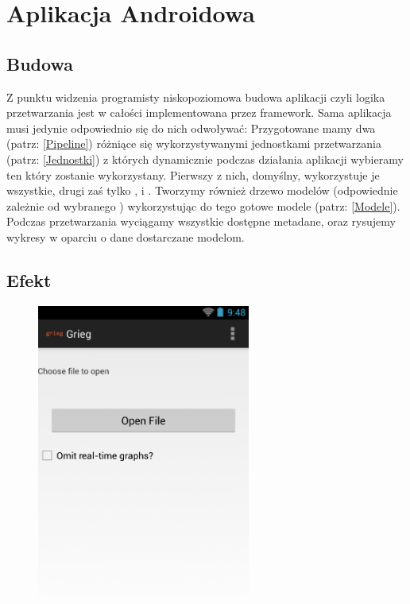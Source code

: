 \chapter{Aplikacja Androidowa}

\section{Budowa}

Z punktu widzenia programisty niskopoziomowa budowa aplikacji czyli logika przetwarzania jest w całości implementowana przez framework. Sama aplikacja musi jedynie odpowiednio się do nich odwoływać: Przygotowane mamy dwa  (patrz: \ref{Pipeline}) różniące się wykorzystywanymi jednostkami przetwarzania (patrz: \ref{Jednostki}) z których dynamicznie podczas działania aplikacji wybieramy ten który zostanie wykorzystany. Pierwszy z nich, domyślny, wykorzystuje je wszystkie, drugi zaś tylko ,  i . Tworzymy również drzewo modelów (odpowiednie
zależnie od wybranego ) wykorzystując do tego gotowe modele (patrz: \ref{Modele}).
Podczas przetwarzania wyciągamy wszystkie dostępne metadane, oraz rysujemy wykresy w oparciu o dane
dostarczane modelom.  

\section{Efekt} 
\begin{figure}[H]
  \centering
  \includegraphics[width=7cm]{images/first_screen}
\end{figure}

